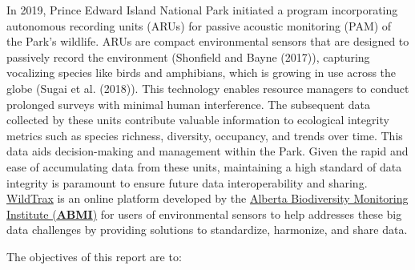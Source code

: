 \documentclass[
  letterpaper,
  DIV=11,
  numbers=noendperiod,
  oneside]{scrartcl}
\begin{document}
In 2019, Prince Edward Island National Park initiated a program
incorporating autonomous recording units (ARUs) for passive acoustic
monitoring (PAM) of the Park's wildlife. ARUs are compact environmental
sensors that are designed to passively record the environment (Shonfield
and Bayne
(2017)),
capturing vocalizing species like birds and amphibians, which is growing
in use across the globe (Sugai et al.
(2018)).
This technology enables resource managers to conduct prolonged surveys
with minimal human interference. The subsequent data collected by these
units contribute valuable information to ecological integrity metrics
such as species richness, diversity, occupancy, and trends over time.
This data aids decision-making and management within the Park. Given the
rapid and ease of accumulating data from these units, maintaining a high
standard of data integrity is paramount to ensure future data
interoperability and sharing. \href{https://www.wildtrax.ca}{WildTrax}
is an online platform developed by the \href{https://abmi.ca}{Alberta
Biodiversity Monitoring Institute (\textbf{ABMI})} for users of
environmental sensors to help addresses these big data challenges by
providing solutions to standardize, harmonize, and share data.

The objectives of this report are to:
\end{document}
